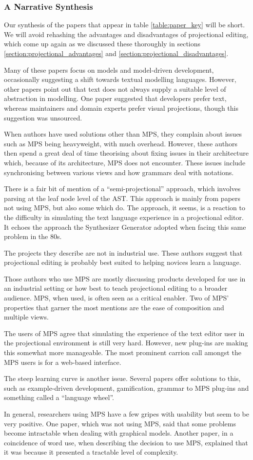 \subsubsection{A Narrative Synthesis}
Our synthesis of the papers that appear in table \ref{table:paper_key} will be short.
We will avoid rehashing the advantages and disadvantages of projectional editing, which come up again as we discussed these thoroughly in sections \ref{section:projectional_advantages} and \ref{section:projectional_disadvantages}.

Many of these papers focus on models and model-driven development, occasionally suggesting a shift towards textual modelling languages.
However, other papers point out that text does not always supply a suitable level of abstraction in modelling.
One paper suggested that developers prefer text, whereas maintainers and domain experts prefer visual projections, though this suggestion was unsourced.

When authors have used solutions other than MPS, they complain about issues such as MPS being heavyweight, with much overhead.
However, these authors then spend a great deal of time theorising about fixing issues in their architecture which, because of its architecture, MPS does not encounter.
These issues include synchronising between various views and how grammars deal with notations.

There is a fair bit of mention of a ``semi-projectional'' approach, which involves parsing at the leaf node level of the AST.
This approach is mainly from papers not using MPS, but also some which do.
The approach, it seems, is a reaction to the difficulty in simulating the text language experience in a projectional editor. 
It echoes the approach the Synthesizer Generator adopted when facing this same problem in the 80s.

The projects they describe are not in industrial use.
These authors suggest that projectional editing is probably best suited to helping novices learn a language. 

Those authors who use MPS are mostly discussing products developed for use in an industrial setting or how best to teach projectional editing to a broader audience.
MPS, when used, is often seen as a critical enabler.
Two of MPS' properties that garner the most mentions are the ease of composition and multiple views.

The users of MPS agree that simulating the experience of the text editor user in the projectional environment is still very hard.
However, new plug-ins are making this somewhat more manageable.
The most prominent carrion call amongst the MPS users is for a web-based interface.

The steep learning curve is another issue.
Several papers offer solutions to this, such as example-driven development, gamification, grammar to MPS plug-ins and something called a ``language wheel''.

In general, researchers using MPS have a few gripes with usability but seem to be very positive.
One paper, which was not using MPS, said that some problems become intractable when dealing with graphical models.
Another paper, in a coincidence of word use, when describing the decision to use MPS, explained that it was because it presented a tractable level of complexity. 
